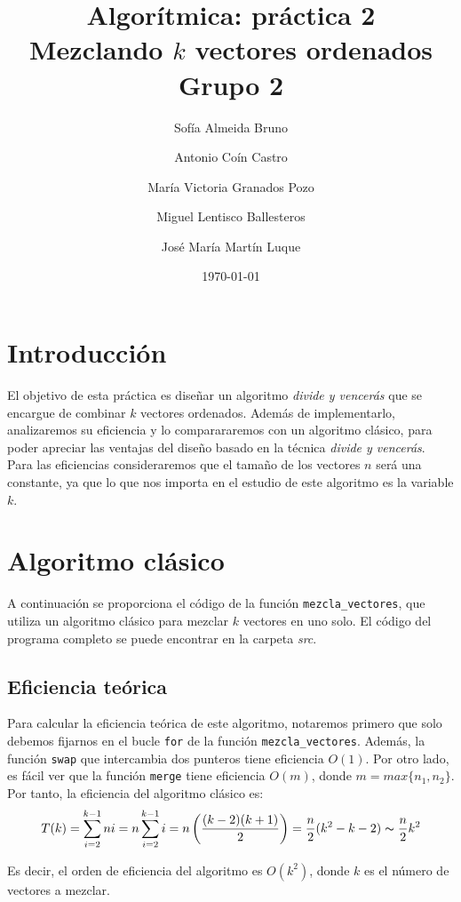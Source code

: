 \documentclass[11pt]{article}
\title{Algorítmica: práctica 2 \\ \large Mezclando $k$ vectores ordenados\\ \vspace{0.2em}Grupo 2}
\author{Sofía Almeida Bruno \and Antonio Coín Castro \and María Victoria Granados Pozo \and Miguel Lentisco Ballesteros \and José María Martín Luque}
\date{\today}
\begin{document}
\maketitle

\newpage

\section*{Introducción}

El objetivo de esta práctica es diseñar un algoritmo \textit{divide y vencerás}
que se encargue de combinar $k$ vectores ordenados. Además de implementarlo, analizaremos su eficiencia y lo comparararemos con un algoritmo clásico, para poder apreciar las ventajas del diseño basado en la técnica \textit{divide y vencerás}. Para las eficiencias consideraremos que el tamaño de los vectores $n$ será una constante, ya que lo que nos importa en el estudio de este algoritmo es la variable $k$.

\section*{Algoritmo clásico}

A continuación se proporciona el código de la función \texttt{mezcla\_vectores},
que utiliza un algoritmo clásico para mezclar $k$ vectores en uno solo. El
código del programa completo se puede encontrar en la carpeta \textit{src}.\\



\subsection*{Eficiencia teórica}

Para calcular la eficiencia teórica de este algoritmo, notaremos primero que solo debemos fijarnos en el bucle \verb|for| de la función \verb|mezcla_vectores|. Además, la función \verb|swap| que intercambia dos punteros tiene eficiencia $O(1)$. Por otro lado, es fácil ver que la función \verb|merge| tiene eficiencia $O(m)$, donde $m = max\{n_1, n_2\}$. Por tanto, la eficiencia del algoritmo clásico es: $$T(k) = \sum_{i=2}^{k-1} ni = n \sum_{i=2}^{k-1} i = n \left( \frac{(k-2)(k+1)}{2} \right) = \frac{n}{2}(k^2 -k - 2) \thicksim \frac{n}{2}k^2$$

Es decir, el orden de eficiencia del algoritmo es $O(k^2)$, donde $k$ es el número de vectores a mezclar.
\end{document}
